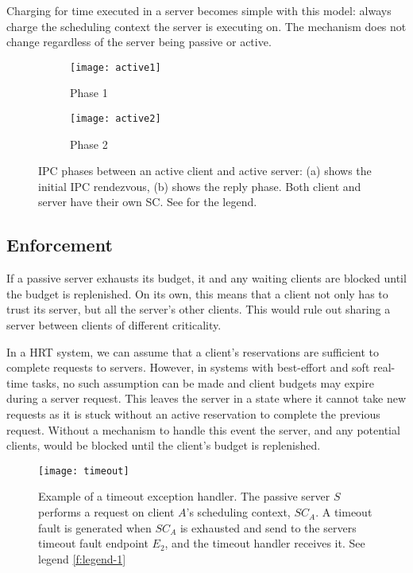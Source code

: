 Charging for time executed in a server becomes simple with this model: always charge the scheduling
context the server is executing on. The mechanism does not change regardless of the server being passive or
active. 

\begin{figure}
    \centering
    \begin{subfigure}[h]{0.48\textwidth}
        \centering
        \texttt{[image: active1]}
        \caption{Phase 1}
        \label{f:active1}
    \end{subfigure}%
    \begin{subfigure}[h]{0.48\textwidth}
        \centering
        \texttt{[image: active2]}
        \caption{Phase 2}
        \label{f:active2}
    \end{subfigure}
    \label{f:active}
    \caption{IPC phases between an active client and active server: (a) shows the initial IPC rendezvous, (b) shows the
    reply phase. Both client and server have their own SC. See  for the legend.}
\end{figure}

\subsection{Enforcement}

If a passive server exhausts its budget, it and any waiting clients
are blocked until the budget is replenished. On its own, this means that a client
not only has to trust its server, but all the server's other
clients. This would rule out sharing a server between clients of
different criticality.

In a \gls{HRT} system, we can assume that a client's reservations are sufficient to complete
requests to servers.  However, in systems with best-effort and soft real-time tasks, no such
assumption can be made and client budgets may expire during a server request.  This leaves the
server in a state where it cannot take new requests as it is stuck without an active reservation to
complete the previous request.  Without a mechanism to handle this event the server, and any
potential clients, would be blocked until the client's budget is replenished.

\begin{figure}
    \centering
    \texttt{[image: timeout]}
    \caption{Example of a timeout exception handler. The passive server $S$ performs a request on
    client $A$'s scheduling context, $SC_{A}$. A timeout fault is generated when $SC_{A}$ is
exhausted and send to the servers timeout fault endpoint $E_{2}$, and the timeout handler receives it. See legend \cref{f:legend-1}}
    \label{f:timeout}
\end{figure}

